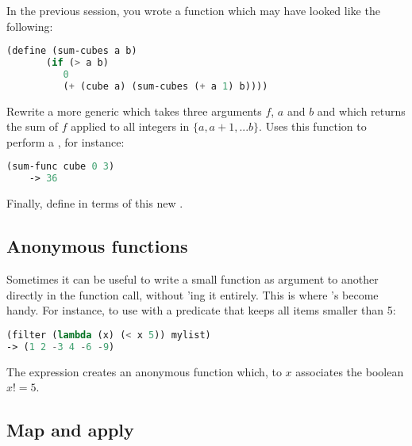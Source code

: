 \documentclass{../../../tp}
\begin{document}
\begin{instruction}
	In the previous session, you wrote a  function which may have looked like the following: 
	
	\begin{lstlisting}[language=lisp]
	(define (sum-cubes a b)
	   (if (> a b)
	      0
	      (+ (cube a) (sum-cubes (+ a 1) b))))
	\end{lstlisting}
	
	Rewrite a more generic  which takes three arguments $f$, $a$ and $b$ and which returns the sum of $f$ applied to all integers in $\{a, a+1, ... b\}$. Uses this function to perform a , for instance:
	\begin{lstlisting}[language=lisp]
	(sum-func cube 0 3)
	-> 36
	\end{lstlisting}
	
	Finally, define  in terms of this new .
\end{instruction}


\subsection{Anonymous functions}

Sometimes it can be useful to write a small function as argument to another directly in the function call, without 'ing it entirely. This is where 's become handy. For instance, to use  with a predicate that keeps all items smaller than 5:

\begin{lstlisting}[language=lisp]
(filter (lambda (x) (< x 5)) mylist)
-> (1 2 -3 4 -6 -9)
\end{lstlisting}

The   expression creates an anonymous function which, to $x$ associates the boolean $x != 5$. 

\subsection{Map and apply}
\end{document}
